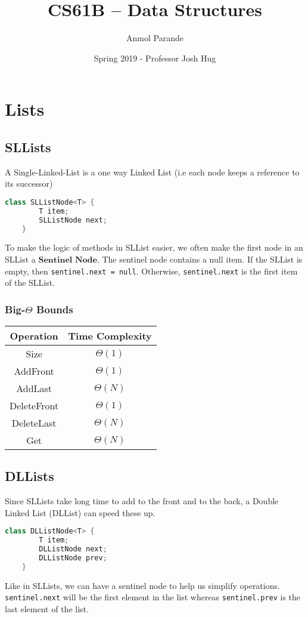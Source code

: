 \documentclass{article}
\begin{document}
    \title{CS61B -- Data Structures}
    \author{Anmol Parande}
    \date{Spring 2019 - Professor Josh Hug}
    \maketitle
\tableofcontents
\newpage
\section{Lists}
\subsection{SLLists}
A Single-Linked-List is a one way Linked List (i.e each node keeps a reference to its successor)
\begin{lstlisting}[language=Java]
    class SLListNode<T> {
        T item;
        SLListNode next;
    }
\end{lstlisting}
To make the logic of methods in SLList easier, we often make the first node in an SLList a $\textbf{Sentinel Node}$.
The sentinel node contains a null item. If the SLList is empty, then \lstinline{sentinel.next = null}.
Otherwise, \lstinline{sentinel.next} is the first item of the SLList.
\subsubsection{Big-$\Theta$ Bounds}
\begin{center}
    \begin{tabular}{ c | c }
     Operation & Time Complexity\\
     \hline
     Size & $\Theta(1)$\\ 
     AddFront & $\Theta(1)$\\  
     AddLast & $\Theta(N)$\\
     DeleteFront & $\Theta(1)$\\
     DeleteLast & $\Theta(N)$\\
     Get & $\Theta(N)$
    \end{tabular}
\end{center}
\subsection{DLLists}
Since SLLists take long time to add to the front and to the back, a Double Linked List (DLList) can speed these up.
\begin{lstlisting}[language=Java]
    class DLListNode<T> {
        T item;
        DLListNode next;
        DLListNode prev;
    }
\end{lstlisting}
Like in SLLists, we can have a sentinel node to help us simplify operations.
\lstinline{sentinel.next} will be the first element in the list whereas \lstinline{sentinel.prev} is the last element of the list.
\end{document}
